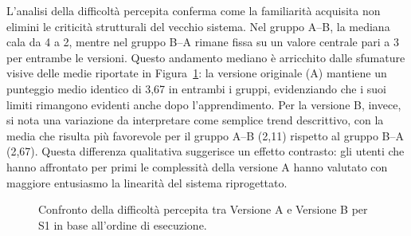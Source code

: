 L'analisi della difficoltà percepita conferma come la familiarità acquisita non elimini le criticità strutturali del vecchio sistema. Nel gruppo A--B, la mediana cala da 4 a 2, mentre nel gruppo B--A rimane fissa su un valore centrale pari a 3 per entrambe le versioni. Questo andamento mediano è arricchito dalle sfumature visive delle medie riportate in Figura~\ref{fig:6-s1-2}: la versione originale (A) mantiene un punteggio medio identico di 3,67 in entrambi i gruppi, evidenziando che i suoi limiti rimangono evidenti anche dopo l'apprendimento. Per la versione B, invece, si nota una variazione da interpretare come semplice trend descrittivo, con la media che risulta più favorevole per il gruppo A--B (2,11) rispetto al gruppo B--A (2,67). Questa differenza qualitativa suggerisce un effetto contrasto: gli utenti che hanno affrontato per primi le complessità della versione A hanno valutato con maggiore entusiasmo la linearità del sistema riprogettato.

\begin{figure}[H]
	\centering
	\caption{Confronto della difficoltà percepita tra Versione A e Versione B per S1 in base all'ordine di esecuzione.}
	\label{fig:6-s1-2}
\end{figure}
